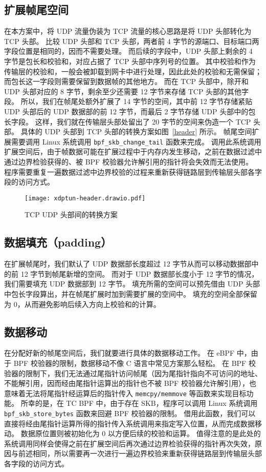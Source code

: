 \subsection{扩展帧尾空间}

在本方案中，将 UDP 流量伪装为 TCP 流量的核心思路是将 UDP 头部转化为 TCP 头部。
比较 UDP 头部和 TCP 头部，两者前 4 字节的源端口、目标端口两字段位置是相同的，因而不需要处理。
而后续的字段中，UDP 头部上剩余的 4 字节是包长和校验和，对应占据了 TCP 头部中序列号的位置。
其中校验和作为传输层的校验和，一般会被卸载到网卡中进行处理，因此此处的校验和无需保留；
而包长这一字段则需要保留到数据帧的其他地方。
而在 TCP 头部中，除开和 UDP 头部对应的 8 字节，剩余至少还需要 12 字节来存储 TCP 头部的其他字段。
所以，我们在帧尾处额外扩展了 14 字节的空间，其中前 12 字节存储紧贴 UDP 头部后的 UDP 数据部的前 12 字节，而最后 2 字节存储 UDP 头部中的包长字段。
这样，我们就在传输层头部处留出了 20 字节的空间来伪造一个 TCP 头部。
具体的 UDP 头部到 TCP 头部的转换方案如图~\ref{header} 所示。
帧尾空间扩展需要调用 Linux 系统调用 \texttt{bpf\_skb\_change\_tail} 函数来完成。
调用此系统调用扩展空间后，由于帧数据可能在扩展过程中于内存内发生移动，之前在数据过滤中通过边界检验获得的、被 BPF 校验器允许解引用的指针将会失效而无法使用。
程序需要重复一遍数据过滤中边界校验的过程来重新获得链路层到传输层头部各字段的访问方式。

\begin{figure}[h]
  \centering
  \texttt{[image: xdptun-header.drawio.pdf]}
  \caption{TCP UDP 头部间的转换方案}
  \label{fig:header}
\end{figure}

\subsection{数据填充（padding）}

在扩展帧尾时，我们默认了 UDP 数据部长度超过 12 字节从而可以移动数据部中的前 12 字节到帧尾新增的空间。
而对于 UDP 数据部长度小于 12 字节的情况，我们需要填充 UDP 数据部到 12 字节。
填充所需的空间可以预先借由 UDP 头部中包长字段算出，并在帧尾扩展时加到需要扩展的空间中。
填充的空间全部保留为 0，从而避免影响后续入方向上校验和的计算。

\subsection{数据移动}

在分配好新的帧尾空间后，我们就要进行具体的数据移动工作。
在 eBPF 中，由于 BPF 校验器的限制，数据移动不像 C 语言中常见方案那么轻松。
在 BPF 校验器的限制下，我们无法通过尾指针访问帧尾（因为尾指针指向不可访问的地址、不能解引用，因而经由尾指针运算出的指针也不被 BPF 校验器允许解引用），也意味着无法将尾指针经运算后的指针传入 \texttt{memcpy/memmove} 等函数来实现目标功能。
所幸的是，在 TC BPF 中，由于存在 SKB，程序可以调用 Linux 系统调用 \texttt{bpf\_skb\_store\_bytes} 函数来回避 BPF 校验器的限制。
借用此函数，我们可以直接将经由尾指针运算所得的指针传入系统调用来指定写入位置，从而完成数据移动。
数据原位置则被初始化为 0 以方便后续的校验和运算。
值得注意的是此处的系统调用同样会使得之前在扩展空间后再次通过边界检验获得的指针再次失效，原因与前述相同，所以需要再一次进行一遍边界校验来重新获得链路层到传输层头部各字段的访问方式。

